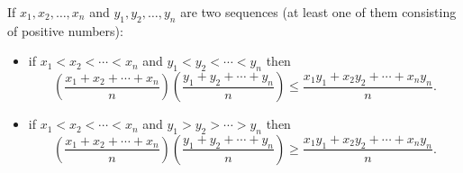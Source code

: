 \documentclass{article}
\begin{document}
If $x_1,x_2,\ldots,x_n$ and $y_1,y_2,\ldots,y_n$ are two sequences (at least one of them consisting of positive numbers):
\begin{itemize}
\item if $x_1<x_2<\cdots<x_n$ and $y_1<y_2<\cdots<y_n$ then$$\left(\frac{x_1+x_2+\cdots+x_n}{n}\right)\left(\frac{y_1+y_2+\cdots+y_n}{n}\right)
\le\frac{x_1y_1+x_2y_2+\cdots+x_ny_n}{n}.$$
\item if $x_1<x_2<\cdots<x_n$ and $y_1>y_2>\cdots>y_n$ then$$\left(\frac{x_1+x_2+\cdots+x_n}{n}\right)\left(\frac{y_1+y_2+\cdots+y_n}{n}\right)
\ge\frac{x_1y_1+x_2y_2+\cdots+x_ny_n}{n}.$$\end{itemize}
\end{document}
